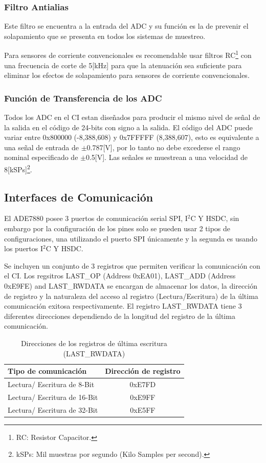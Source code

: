 \documentclass[letterpaper,12pt,oneside]{book}
\begin{document}
				\subsubsection{Filtro Antialias}
				Este filtro se encuentra a la entrada del ADC y su función es la de prevenir el solapamiento que se presenta en todos los sistemas de muestreo.

				Para sensores de corriente convencionales es recomendable usar filtros RC\footnote{RC: Resistor Capacitor.} con una frecuencia de corte de 5[kHz] para que la atenuación sea suficiente para eliminar los efectos de solapamiento para sensores de corriente convencionales.

				\subsubsection{Función de Transferencia de los ADC}
				Todos los ADC en el CI estan diseñados para producir el mismo nivel de señal de la salida en el código de 24-bits con signo a la salida. El código del ADC puede variar entre 0x800000 (-8,388,608) y 0x7FFFFF (8,388,607), esto es equivalente a una señal de entrada de $\pm$0.787[V], por lo tanto no debe excederse el rango nominal especificado de $\pm$0.5[V]. Las señales se muestrean a una velocidad de 8[kSPs]\footnote{kSPs: Mil muestras por segundo (Kilo Samples per second).}.

			\subsection{Interfaces de Comunicación}
			El ADE7880 posee 3 puertos de comunicación serial SPI, I$^2$C Y HSDC, sin embargo por la configuración de los pines solo se pueden usar 2 tipos de configuraciones, una utilizando el puerto SPI únicamente y la segunda es usando los puertos I$^2$C Y HSDC.

			Se incluyen un conjunto de 3 registros que permiten verificar la comunicación con el CI. Los regsitros LAST\_OP (Address 0xEA01), LAST\_ADD (Address 0xE9FE) and LAST\_RWDATA se encargan de almacenar los datos, la dirección de registro y la naturaleza del acceso al registro (Lectura/Escritura) de la última comunicación exitosa respectivamente. El registro LAST\_RWDATA tiene 3 diferentes direcciones dependiendo de la longitud del registro de la última comunicación.

			\begin{table}[!htpb]
				\centering
				\begin{tabular}{ l | c }
					\textbf{Tipo de comunicación} & \textbf{Dirección de registro} \\
					\hline
					Lectura/ Escritura de 8-Bit & 0xE7FD \\
					Lectura/ Escritura de 16-Bit & 0xE9FF \\
					Lectura/ Escritura de 32-Bit & 0xE5FF \\
				\end{tabular}
				\caption[Registros de última escritura]{Direcciones de los registros de última escritura (LAST\_RWDATA)}
			\end{table}
\end{document}

